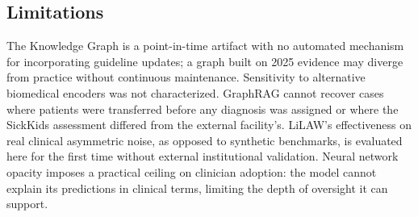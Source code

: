 \subsection{Limitations}

The Knowledge Graph is a point-in-time artifact with no automated mechanism for incorporating guideline updates; a graph built on 2025 evidence may diverge from practice without continuous maintenance. Sensitivity to alternative biomedical encoders was not characterized. GraphRAG cannot recover cases where patients were transferred before any diagnosis was assigned or where the SickKids assessment differed from the external facility's. LiLAW's effectiveness on real clinical asymmetric noise, as opposed to synthetic benchmarks, is evaluated here for the first time without external institutional validation. Neural network opacity imposes a practical ceiling on clinician adoption: the model cannot explain its predictions in clinical terms, limiting the depth of oversight it can support.
